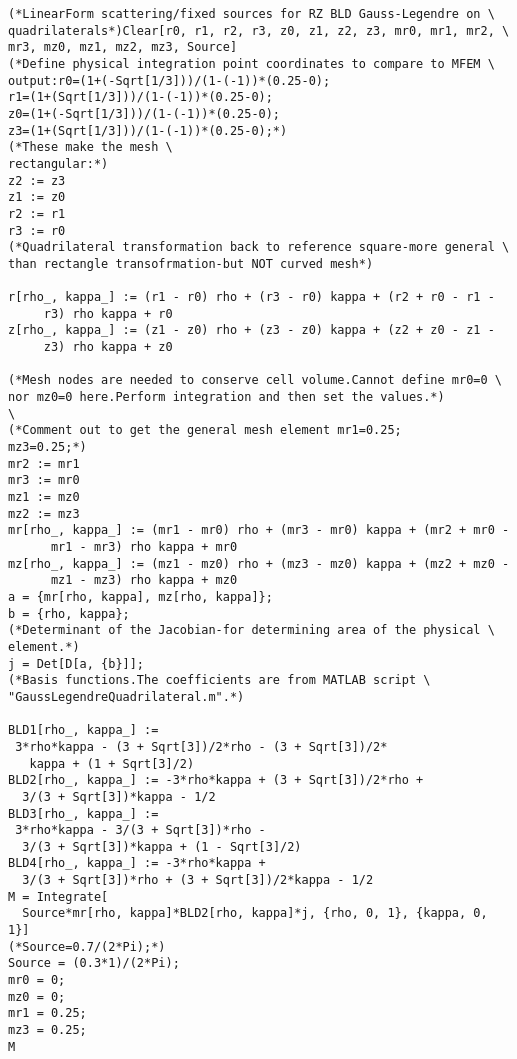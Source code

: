 \documentclass{article}
\begin{document}
\begin{verbatim}
(*LinearForm scattering/fixed sources for RZ BLD Gauss-Legendre on \
quadrilaterals*)Clear[r0, r1, r2, r3, z0, z1, z2, z3, mr0, mr1, mr2, \
mr3, mz0, mz1, mz2, mz3, Source]
(*Define physical integration point coordinates to compare to MFEM \
output:r0=(1+(-Sqrt[1/3]))/(1-(-1))*(0.25-0);
r1=(1+(Sqrt[1/3]))/(1-(-1))*(0.25-0);
z0=(1+(-Sqrt[1/3]))/(1-(-1))*(0.25-0);
z3=(1+(Sqrt[1/3]))/(1-(-1))*(0.25-0);*)
(*These make the mesh \
rectangular:*)
z2 := z3
z1 := z0
r2 := r1
r3 := r0
(*Quadrilateral transformation back to reference square-more general \
than rectangle transofrmation-but NOT curved mesh*)

r[rho_, kappa_] := (r1 - r0) rho + (r3 - r0) kappa + (r2 + r0 - r1 - 
     r3) rho kappa + r0
z[rho_, kappa_] := (z1 - z0) rho + (z3 - z0) kappa + (z2 + z0 - z1 - 
     z3) rho kappa + z0

(*Mesh nodes are needed to conserve cell volume.Cannot define mr0=0 \
nor mz0=0 here.Perform integration and then set the values.*)
\
(*Comment out to get the general mesh element mr1=0.25;
mz3=0.25;*)
mr2 := mr1
mr3 := mr0
mz1 := mz0
mz2 := mz3
mr[rho_, kappa_] := (mr1 - mr0) rho + (mr3 - mr0) kappa + (mr2 + mr0 -
      mr1 - mr3) rho kappa + mr0
mz[rho_, kappa_] := (mz1 - mz0) rho + (mz3 - mz0) kappa + (mz2 + mz0 -
      mz1 - mz3) rho kappa + mz0
a = {mr[rho, kappa], mz[rho, kappa]};
b = {rho, kappa};
(*Determinant of the Jacobian-for determining area of the physical \
element.*)
j = Det[D[a, {b}]];
(*Basis functions.The coefficients are from MATLAB script \
"GaussLegendreQuadrilateral.m".*)

BLD1[rho_, kappa_] := 
 3*rho*kappa - (3 + Sqrt[3])/2*rho - (3 + Sqrt[3])/2*
   kappa + (1 + Sqrt[3]/2)
BLD2[rho_, kappa_] := -3*rho*kappa + (3 + Sqrt[3])/2*rho + 
  3/(3 + Sqrt[3])*kappa - 1/2
BLD3[rho_, kappa_] := 
 3*rho*kappa - 3/(3 + Sqrt[3])*rho - 
  3/(3 + Sqrt[3])*kappa + (1 - Sqrt[3]/2)
BLD4[rho_, kappa_] := -3*rho*kappa + 
  3/(3 + Sqrt[3])*rho + (3 + Sqrt[3])/2*kappa - 1/2
M = Integrate[
  Source*mr[rho, kappa]*BLD2[rho, kappa]*j, {rho, 0, 1}, {kappa, 0, 1}]
(*Source=0.7/(2*Pi);*)
Source = (0.3*1)/(2*Pi);
mr0 = 0;
mz0 = 0;
mr1 = 0.25;
mz3 = 0.25;
M
\end{verbatim}
\end{document}
